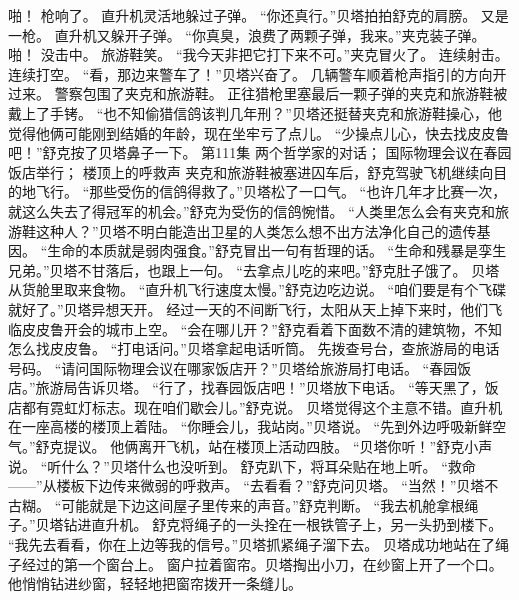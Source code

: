 \documentclass[a4paper,12pt,UTF8,twoside]{ctexbook}
\begin{document}
        啪！ 
        枪响了。 
        直升机灵活地躲过子弹。 
        “你还真行。”贝塔拍拍舒克的肩膀。 
        又是一枪。 
        直升机又躲开子弹。 
        “你真臭，浪费了两颗子弹，我来。”夹克装子弹。 
        啪！ 
        没击中。 
        旅游鞋笑。 
        “我今天非把它打下来不可。”夹克冒火了。 
        连续射击。 
        连续打空。 
        “看，那边来警车了！”贝塔兴奋了。 
        几辆警车顺着枪声指引的方向开过来。 
        警察包围了夹克和旅游鞋。 
        正往猎枪里塞最后一颗子弹的夹克和旅游鞋被戴上了手铐。 
        “也不知偷猎信鸽该判几年刑？”贝塔还挺替夹克和旅游鞋操心，他觉得他俩可能刚到结婚的年龄，现在坐牢亏了点儿。 
        “少操点儿心，快去找皮皮鲁吧！”舒克按了贝塔鼻子一下。   第111集 
        两个哲学家的对话； 
        国际物理会议在春园饭店举行； 
        楼顶上的呼救声 
        夹克和旅游鞋被塞进囚车后，舒克驾驶飞机继续向目的地飞行。 
        “那些受伤的信鸽得救了。”贝塔松了一口气。 
        “也许几年才比赛一次，就这么失去了得冠军的机会。”舒克为受伤的信鸽惋惜。 
        “人类里怎么会有夹克和旅游鞋这种人？”贝塔不明白能造出卫星的人类怎么想不出方法净化自己的遗传基因。 
        “生命的本质就是弱肉强食。”舒克冒出一句有哲理的话。 
        “生命和残暴是孪生兄弟。”贝塔不甘落后，也跟上一句。 
        “去拿点儿吃的来吧。”舒克肚子饿了。 
        贝塔从货舱里取来食物。 
        “直升机飞行速度太慢。”舒克边吃边说。 
        “咱们要是有个飞碟就好了。”贝塔异想天开。 
        经过一天的不间断飞行，太阳从天上掉下来时，他们飞临皮皮鲁开会的城市上空。 
        “会在哪儿开？”舒克看着下面数不清的建筑物，不知怎么找皮皮鲁。 
        “打电话问。”贝塔拿起电话听筒。 
        先拨查号台，查旅游局的电话号码。 
        “请问国际物理会议在哪家饭店开？”贝塔给旅游局打电话。 
        “春园饭店。”旅游局告诉贝塔。 
        “行了，找春园饭店吧！”贝塔放下电话。 
        “等天黑了，饭店都有霓虹灯标志。现在咱们歇会儿。”舒克说。 
        贝塔觉得这个主意不错。直升机在一座高楼的楼顶上着陆。 
        “你睡会儿，我站岗。”贝塔说。 
        “先到外边呼吸新鲜空气。”舒克提议。 
        他俩离开飞机，站在楼顶上活动四肢。 
        “贝塔你听！”舒克小声说。 
        “听什么？”贝塔什么也没听到。 
        舒克趴下，将耳朵贴在地上听。 
        “救命——”从楼板下边传来微弱的呼救声。 
        “去看看？”舒克问贝塔。 
        “当然！”贝塔不古糊。 
        “可能就是下边这间屋子里传来的声音。”舒克判断。 
        “我去机舱拿根绳子。”贝塔钻进直升机。 
        舒克将绳子的一头拴在一根铁管子上，另一头扔到楼下。 
        “我先去看看，你在上边等我的信号。”贝塔抓紧绳子溜下去。 
        贝塔成功地站在了绳子经过的第一个窗台上。 
        窗户拉着窗帘。贝塔掏出小刀，在纱窗上开了一个口。 
        他悄悄钻进纱窗，轻轻地把窗帘拨开一条缝儿。 
\end{document}
